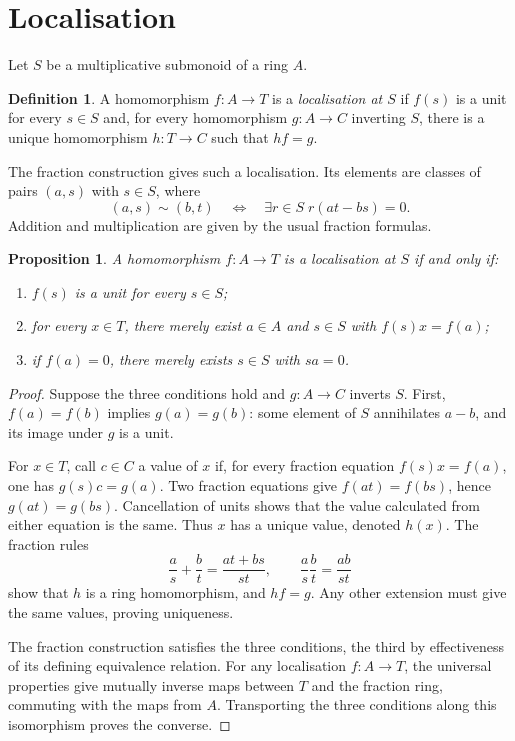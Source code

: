 \documentclass[11pt]{amsart}
\newtheorem{proposition}[theorem]{Proposition}
\theoremstyle{definition}
\newtheorem{definition}[theorem]{Definition}
\theoremstyle{remark}
\begin{document}
\section{Localisation}

Let $S$ be a multiplicative submonoid of a ring $A$.

\begin{definition}
A homomorphism $f:A\to T$ is a \emph{localisation at $S$} if $f(s)$ is a
unit for every $s\in S$ and, for every homomorphism $g:A\to C$ inverting
$S$, there is a unique homomorphism $h:T\to C$ such that $hf=g$.
\end{definition}

The fraction construction gives such a localisation. Its elements are
classes of pairs $(a,s)$ with $s\in S$, where
\[
 (a,s)\sim(b,t)\quad\Longleftrightarrow\quad
 \exists r\in S\; r(at-bs)=0.
\]
Addition and multiplication are given by the usual fraction formulas.

\begin{proposition}\label{prop:elementary}
A homomorphism $f:A\to T$ is a localisation at $S$ if and only if:
\begin{enumerate}
\item $f(s)$ is a unit for every $s\in S$;
\item for every $x\in T$, there merely exist $a\in A$ and $s\in S$ with
      $f(s)x=f(a)$;
\item if $f(a)=0$, there merely exists $s\in S$ with $sa=0$.
\end{enumerate}
\end{proposition}

\begin{proof}
Suppose the three conditions hold and $g:A\to C$ inverts $S$. First,
$f(a)=f(b)$ implies $g(a)=g(b)$: some element of $S$ annihilates $a-b$,
and its image under $g$ is a unit.

For $x\in T$, call $c\in C$ a value of $x$ if, for every fraction equation
$f(s)x=f(a)$, one has $g(s)c=g(a)$. Two fraction equations give
$f(at)=f(bs)$, hence $g(at)=g(bs)$. Cancellation of units shows that the
value calculated from either equation is the same. Thus $x$ has a unique
value, denoted $h(x)$. The fraction rules
\[
 \frac a s+\frac b t=\frac{at+bs}{st},\qquad
 \frac a s\frac b t=\frac{ab}{st}
\]
show that $h$ is a ring homomorphism, and $hf=g$. Any other extension
must give the same values, proving uniqueness.

The fraction construction satisfies the three conditions, the third by
effectiveness of its defining equivalence relation. For any localisation
$f:A\to T$, the universal properties give mutually inverse maps between
$T$ and the fraction ring, commuting with the maps from $A$. Transporting
the three conditions along this isomorphism proves the converse.
\end{proof}
\end{document}
